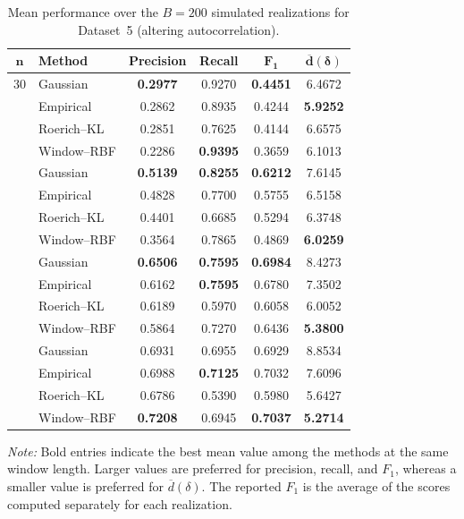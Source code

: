 \begin{table}[!htbp]
    \centering
    \caption{Mean performance over the \(B=200\) simulated realizations for Dataset~5 (altering autocorrelation).}
    \label{tab:mean_metrics_dataset5}
    \small
    \setlength{\tabcolsep}{5pt}
    \renewcommand{\arraystretch}{1.08}
    \begin{tabular}{@{}clcccc@{}}
        \toprule
        \(\boldsymbol{n}\) & \textbf{Method} & \textbf{Precision} & \textbf{Recall} & \(\boldsymbol{F_1}\) & \(\boldsymbol{\overline{d}(\delta)}\) \\
        \midrule
        30 & Gaussian & \textbf{0.2977} & 0.9270 & \textbf{0.4451} & 6.4672 \\
         & Empirical & 0.2862 & 0.8935 & 0.4244 & \textbf{5.9252} \\
         & Roerich--KL & 0.2851 & 0.7625 & 0.4144 & 6.6575 \\
         & Window--RBF & 0.2286 & \textbf{0.9395} & 0.3659 & 6.1013 \\
        \addlinespace[2pt]
        50 & Gaussian & \textbf{0.5139} & \textbf{0.8255} & \textbf{0.6212} & 7.6145 \\
         & Empirical & 0.4828 & 0.7700 & 0.5755 & 6.5158 \\
         & Roerich--KL & 0.4401 & 0.6685 & 0.5294 & 6.3748 \\
         & Window--RBF & 0.3564 & 0.7865 & 0.4869 & \textbf{6.0259} \\
        \addlinespace[2pt]
        80 & Gaussian & \textbf{0.6506} & \textbf{0.7595} & \textbf{0.6984} & 8.4273 \\
         & Empirical & 0.6162 & \textbf{0.7595} & 0.6780 & 7.3502 \\
         & Roerich--KL & 0.6189 & 0.5970 & 0.6058 & 6.0052 \\
         & Window--RBF & 0.5864 & 0.7270 & 0.6436 & \textbf{5.3800} \\
        \addlinespace[2pt]
        100 & Gaussian & 0.6931 & 0.6955 & 0.6929 & 8.8534 \\
         & Empirical & 0.6988 & \textbf{0.7125} & 0.7032 & 7.6096 \\
         & Roerich--KL & 0.6786 & 0.5390 & 0.5980 & 5.6427 \\
         & Window--RBF & \textbf{0.7208} & 0.6945 & \textbf{0.7037} & \textbf{5.2714} \\
        \bottomrule
    \end{tabular}
    \begin{flushleft}
        \footnotesize \textit{Note:} Bold entries indicate the best mean value among the methods at the same window length. Larger values are preferred for precision, recall, and \(F_1\), whereas a smaller value is preferred for \(\overline{d}(\delta)\). The reported \(F_1\) is the average of the scores computed separately for each realization.
    \end{flushleft}
\end{table}